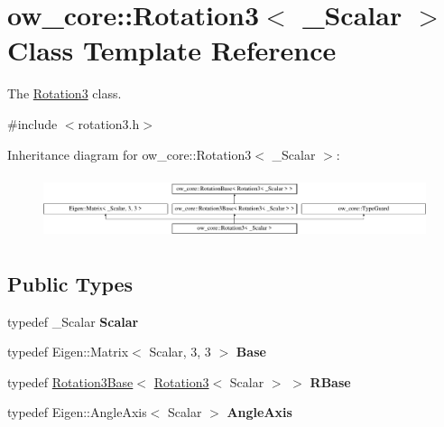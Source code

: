 \hypertarget{classow__core_1_1Rotation3}{}\section{ow\+\_\+core\+:\+:Rotation3$<$ \+\_\+\+Scalar $>$ Class Template Reference}
\label{classow__core_1_1Rotation3}


The \hyperlink{classow__core_1_1Rotation3}{Rotation3} class.  




{\ttfamily \#include $<$rotation3.\+h$>$}

Inheritance diagram for ow\+\_\+core\+:\+:Rotation3$<$ \+\_\+\+Scalar $>$\+:\begin{figure}[H]
\begin{center}
\leavevmode
\includegraphics[height=1.872910cm]{db/dd7/classow__core_1_1Rotation3}
\end{center}
\end{figure}
\subsection*{Public Types}
\begin{DoxyCompactItemize}
\item 
typedef \+\_\+\+Scalar {\bfseries Scalar}\hypertarget{classow__core_1_1Rotation3_a470ab3889d669c7c775de59719a05cd5}{}\label{classow__core_1_1Rotation3_a470ab3889d669c7c775de59719a05cd5}

\item 
typedef Eigen\+::\+Matrix$<$ Scalar, 3, 3 $>$ {\bfseries Base}\hypertarget{classow__core_1_1Rotation3_a2ab55aac918ebcfcb6cf35187679bb5e}{}\label{classow__core_1_1Rotation3_a2ab55aac918ebcfcb6cf35187679bb5e}

\item 
typedef \hyperlink{classow__core_1_1Rotation3Base}{Rotation3\+Base}$<$ \hyperlink{classow__core_1_1Rotation3}{Rotation3}$<$ Scalar $>$ $>$ {\bfseries R\+Base}\hypertarget{classow__core_1_1Rotation3_a489dc700fb179eb074ffe11218e71384}{}\label{classow__core_1_1Rotation3_a489dc700fb179eb074ffe11218e71384}

\item 
typedef Eigen\+::\+Angle\+Axis$<$ Scalar $>$ {\bfseries Angle\+Axis}\hypertarget{classow__core_1_1Rotation3_a22dd80aef9d78599821eb23691c41b1a}{}\label{classow__core_1_1Rotation3_a22dd80aef9d78599821eb23691c41b1a}

\end{DoxyCompactItemize}
